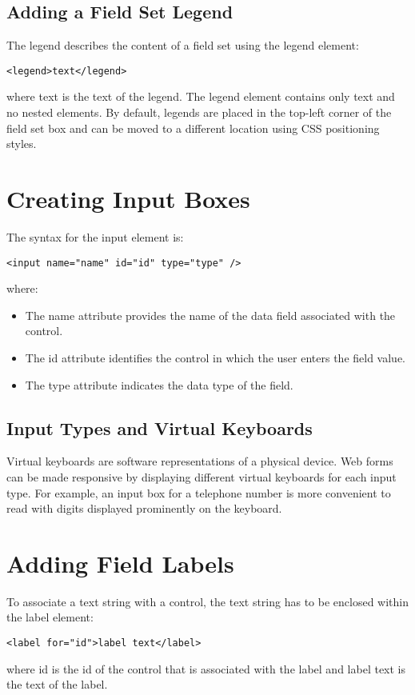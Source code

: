 \documentclass{article}
\begin{document}
\subsection{Adding a Field Set Legend}
The legend describes the content of a field set using the legend element:
\begin{lstlisting}
<legend>text</legend>
\end{lstlisting}
where text is the text of the legend. The legend element contains only text and no nested elements. By default, legends are placed in the top-left corner of the field set box and can be moved to a different location using CSS positioning styles.

\section{Creating Input Boxes}
The syntax for the input element is:
\begin{lstlisting}
<input name="name" id="id" type="type" />
\end{lstlisting}
where:
\begin{itemize}
    \item The name attribute provides the name of the data field associated with the control.
    \item The id attribute identifies the control in which the user enters the field value.
    \item The type attribute indicates the data type of the field.
\end{itemize}

\subsection{Input Types and Virtual Keyboards}
Virtual keyboards are software representations of a physical device. Web forms can be made responsive by displaying different virtual keyboards for each input type. For example, an input box for a telephone number is more convenient to read with digits displayed prominently on the keyboard.

\section{Adding Field Labels}
To associate a text string with a control, the text string has to be enclosed within the label element:
\begin{lstlisting}
<label for="id">label text</label>
\end{lstlisting}
where id is the id of the control that is associated with the label and label text is the text of the label.
\end{document}
